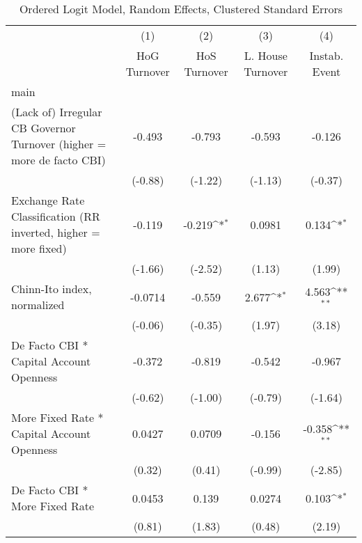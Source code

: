 {
\def\sym#1{\ifmmode^{#1}\else\(^{#1}\)\fi}
\begin{longtable}{l*{4}{c}}
\caption{Ordered Logit Model, Random Effects, Clustered Standard Errors \label{kapintlagordLogLogDF}}\\
\hline\hline\endfirsthead\hline\endhead\hline\endfoot\endlastfoot
                &\multicolumn{1}{c}{(1)}&\multicolumn{1}{c}{(2)}&\multicolumn{1}{c}{(3)}&\multicolumn{1}{c}{(4)}\\
                &\multicolumn{1}{c}{HoG Turnover}&\multicolumn{1}{c}{HoS Turnover}&\multicolumn{1}{c}{L. House Turnover}&\multicolumn{1}{c}{Instab. Event}\\
\hline
main            &                  &                  &                  &                  \\
(Lack of) Irregular CB Governor Turnover (higher = more de facto CBI)&   -0.493         &   -0.793         &   -0.593         &   -0.126         \\
                &  (-0.88)         &  (-1.22)         &  (-1.13)         &  (-0.37)         \\
[1em]
Exchange Rate Classification (RR inverted, higher = more fixed)&   -0.119         &   -0.219\sym{*}  &   0.0981         &    0.134\sym{*}  \\
                &  (-1.66)         &  (-2.52)         &   (1.13)         &   (1.99)         \\
[1em]
Chinn-Ito index, normalized&  -0.0714         &   -0.559         &    2.677\sym{*}  &    4.563\sym{**} \\
                &  (-0.06)         &  (-0.35)         &   (1.97)         &   (3.18)         \\
[1em]
De Facto CBI * Capital Account Openness&   -0.372         &   -0.819         &   -0.542         &   -0.967         \\
                &  (-0.62)         &  (-1.00)         &  (-0.79)         &  (-1.64)         \\
[1em]
More Fixed Rate * Capital Account Openness&   0.0427         &   0.0709         &   -0.156         &   -0.358\sym{**} \\
                &   (0.32)         &   (0.41)         &  (-0.99)         &  (-2.85)         \\
[1em]
De Facto CBI * More Fixed Rate&   0.0453         &    0.139         &   0.0274         &    0.103\sym{*}  \\
                &   (0.81)         &   (1.83)         &   (0.48)         &   (2.19)         \\

\end{longtable}}
